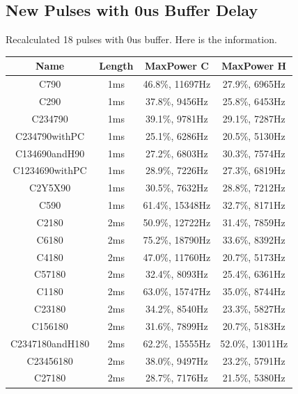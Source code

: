 \subsection{New Pulses with 0us Buffer Delay}

Recalculated 18 pulses with 0us buffer. Here is the information.
\begin{table}[!h]
\begin{tabular} {c||c|c|c}
  \hline
  Name & Length & MaxPower C & MaxPower H\\
  \hline
  C790 & 1ms & 46.8\%, 11697Hz & 27.9\%, 6965Hz\\
  C290 & 1ms & 37.8\%, 9456Hz & 25.8\%, 6453Hz\\
  C234790 & 1ms & 39.1\%, 9781Hz & 29.1\%, 7287Hz\\
  C234790withPC & 1ms & 25.1\%, 6286Hz & 20.5\%, 5130Hz\\
  C134690andH90 & 1ms & 27.2\%, 6803Hz & 30.3\%, 7574Hz\\
  C1234690withPC & 1ms & 28.9\%, 7226Hz & 27.3\%, 6819Hz\\
  C2Y5X90 & 1ms & 30.5\%, 7632Hz & 28.8\%, 7212Hz\\
  C590 & 1ms & 61.4\%, 15348Hz & 32.7\%, 8171Hz\\
  C2180 & 2ms & 50.9\%, 12722Hz & 31.4\%, 7859Hz\\
  C6180 & 2ms & 75.2\%, 18790Hz & 33.6\%, 8392Hz\\
  C4180 & 2ms & 47.0\%, 11760Hz & 20.7\%, 5173Hz\\
  C57180 & 2ms & 32.4\%, 8093Hz & 25.4\%, 6361Hz\\
  C1180 & 2ms & 63.0\%, 15747Hz & 35.0\%, 8744Hz\\
  C23180 & 2ms & 34.2\%, 8540Hz & 23.3\%, 5827Hz\\
  C156180 & 2ms & 31.6\%, 7899Hz & 20.7\%, 5183Hz\\
  C2347180andH180 & 2ms & 62.2\%, 15555Hz & 52.0\%, 13011Hz\\
  C23456180 & 2ms & 38.0\%, 9497Hz & 23.2\%, 5791Hz\\
  C27180 & 2ms & 28.7\%, 7176Hz & 21.5\%, 5380Hz\\
  \hline
\end{tabular}
\end{table} 